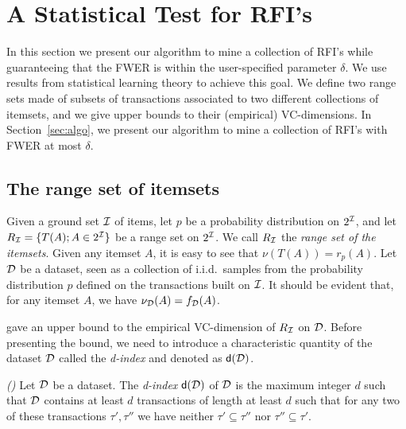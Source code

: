 \section{A Statistical Test for RFI's}\label{sec:main}
In this section we present our algorithm to mine a collection of RFI's
while guaranteeing that the FWER is within the user-specified parameter
$\delta$. We use results from statistical learning theory to achieve this goal.
We define two range sets made of subsets of transactions associated to two different
collections of itemsets, and we give upper bounds to their (empirical)
VC-dimensions. In Section~\ref{sec:algo}, we
present our algorithm to mine a collection of RFI's with FWER at most $\delta$.

\subsection{The range set of itemsets}\label{sec:rangeitemsets}
Given a ground set ${\cal I}$ of items, let $p$ be a probability distribution on $2^{\cal I}$,
and let $R_{\cal I}=\{T(A); A\in 2^{{\cal I}}\}$ be a range set
on $2^{\cal I}$. We call $R_{\cal I}$ the \emph{range set of the itemsets}. Given any
itemset $A$, it is easy to see that $\nu(T(A))=r_p(A)$. Let ${\cal D}$ be a dataset,
seen as a collection of i.i.d.~samples from the probability distribution $p$
defined on the transactions built on ${\cal I}$. It should be evident that, for any
itemset $A$, we have $\nu_{\cal D}(A)=f_{\cal D}(A)$.  

\iffalse
{\bf XXX:} In the reference for \citep{RiondatoU12} mention the extended revised
version from arXiv, from which the definition and the theorem below are taken
(but the numbers are the same from the PKDD one). We could just reference the
one from arXiv instead, but I prefer to reference the one from PKDD with the
additional specification, to give more ``weight.
\fi

\citet{RiondatoU12} gave an upper bound to the empirical VC-dimension of
$R_{\cal I}$ on ${\cal D}$. Before presenting the bound, we need to introduce a
characteristic quantity of the dataset ${\cal D}$ called the \emph{d-index} and
denoted as $\mathsf{d}({\cal D})$.
\begin{definition}\label{def:dindex}
  \emph{(\citep[Def.~12]{RiondatoU12})} Let ${\cal D}$ be a dataset. The
  \emph{d-index} $\mathsf{d}({\cal D})$ of ${\cal D}$ is the maximum integer $d$ such that
  ${\cal D}$ contains at least $d$ transactions of length at least $d$ such that for
  any two of these transactions $\tau',\tau''$ we have neither $\tau'\subseteq
  \tau''$ nor $\tau''\subseteq \tau'$.
\end{definition}

